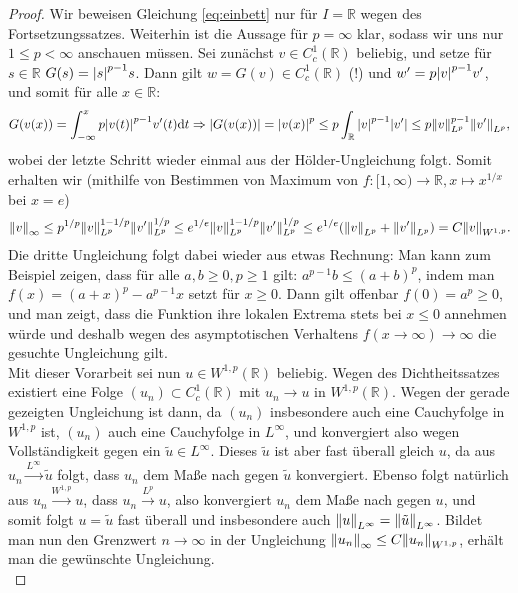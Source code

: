 \documentclass[twoside]{article}
\theoremstyle{definition}
\begin{document}
\begin{proof}
Wir beweisen Gleichung \ref{eq:einbett} nur für $I = \mathbb{R}$ wegen des Fortsetzungssatzes. Weiterhin ist die Aussage für $p = \infty$ klar, sodass wir uns nur $1 \leq p < \infty$ anschauen müssen. Sei zunächst $v \in C_c^1(\mathbb{R})$ beliebig, und setze für $s \in \mathbb{R}$ $G(s)= \abs{s}^{p-1} s$. Dann gilt $w = G(v) \in C_c^1(\mathbb{R})$ (!) und $w' = p \abs{v}^{p-1} v'$, und somit für alle $x \in \mathbb{R}$:
\begin{align*}
G(v(x)) = \int_{-\infty}^x  p \abs{v(t)}^{p-1} v'(t) \mathrm{d}t \Rightarrow \abs{G(v(x))} = \abs{v(x)}^p \leq p \int_\mathbb{R} \abs{v}^{p-1} \abs{v'} \leq p \norm{v}_{L^p}^{p-1} \norm{v'}_{L^p},
\end{align*}
wobei der letzte Schritt wieder einmal aus der Hölder-Ungleichung folgt. Somit erhalten wir (mithilfe von Bestimmen von Maximum von $f:[1,\infty) \to \mathbb{R}, x \mapsto x^{1/x}$ bei $x=e$)
\begin{align*}
\norm{v}_\infty \leq p^{1/p} \norm{v}_{L^p}^{1-1/p} \norm{v'}_{L^p}^{1/p} \leq e^{1/e} \norm{v}_{L^p}^{1-1/p} \norm{v'}_{L^p}^{1/p} \leq e^{1/e} (\norm{v}_{L^p} + \norm{v'}_{L^p}) = C \norm{v}_{W^{1,p}}.
\end{align*}
Die dritte Ungleichung folgt dabei wieder aus etwas Rechnung: Man kann zum Beispiel zeigen, dass für alle $a,b \geq 0, p \geq 1$ gilt: $a^{p-1}b \leq (a+b)^p$, indem man $f(x)=(a+x)^p-a^{p-1}x$ setzt für $x \geq 0$. Dann gilt offenbar $f(0) = a^p \geq 0$, und man zeigt, dass die Funktion ihre lokalen Extrema stets bei $x \leq 0$ annehmen würde und deshalb wegen des asymptotischen Verhaltens $f(x \to \infty) \to \infty$ die gesuchte Ungleichung gilt.\\

Mit dieser Vorarbeit sei nun $u \in W^{1,p}(\mathbb{R})$ beliebig. Wegen des Dichtheitssatzes existiert eine Folge $(u_n) \subset C^1_c(\mathbb{R})$ mit $u_n \to u$ in $W^{1,p}(\mathbb{R})$. Wegen der gerade gezeigten Ungleichung ist dann, da $(u_n)$ insbesondere auch eine Cauchyfolge in $W^{1,p}$ ist, $(u_n)$ auch eine Cauchyfolge in $L^\infty$, und konvergiert also wegen Vollständigkeit gegen ein $\tilde{u} \in L^\infty$. Dieses $\tilde{u}$ ist aber fast überall gleich $u$, da aus $u_n \xrightarrow{L^\infty} \tilde{u}$ folgt, dass $u_n$ dem Maße nach gegen $\tilde{u}$ konvergiert. Ebenso folgt natürlich aus $u_n \xrightarrow{W^{1,p}} u$, dass $u_n \xrightarrow{L^p} u$, also konvergiert $u_n$ dem Maße nach gegen $u$, und somit folgt $u = \tilde{u}$ fast überall und insbesondere auch $\norm{u}_{L^\infty}=\norm{\tilde{u}}_{L^\infty}$. Bildet man nun den Grenzwert $n \to \infty$ in der Ungleichung $\norm{u_n}_{\infty} \leq C \norm{u_n}_{W^{1,p}}$, erhält man die gewünschte Ungleichung.\\


\end{proof}
\end{document}
